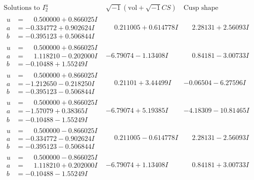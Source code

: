 \documentclass[1p]{elsarticle_modified}
\theoremstyle{definition}
\newcommand{\I}{\sqrt{-1}}
\begin{document}
$$\begin{array}{c|c|c}  
\text{Solutions to }I^u_{2}& \I (\text{vol} + \sqrt{-1}CS) & \text{Cusp shape}\\
 \hline 
\begin{aligned}
u &= \phantom{-}0.500000 + 0.866025 I \\
a &= -0.334772 + 0.902624 I \\
b &= -0.395123 + 0.506844 I\end{aligned}
 & \phantom{-}0.211005 + 0.614778 I & \phantom{-}2.28131 + 2.56093 I \\ \hline\begin{aligned}
u &= \phantom{-}0.500000 + 0.866025 I \\
a &= \phantom{-}1.118210 - 0.202000 I \\
b &= -0.10488 + 1.55249 I\end{aligned}
 & -6.79074 - 1.13408 I & \phantom{-}0.84181 - 3.00733 I \\ \hline\begin{aligned}
u &= \phantom{-}0.500000 + 0.866025 I \\
a &= -1.212650 - 0.218250 I \\
b &= -0.395123 - 0.506844 I\end{aligned}
 & \phantom{-}0.21101 + 3.44499 I & -0.06504 - 6.27596 I \\ \hline\begin{aligned}
u &= \phantom{-}0.500000 + 0.866025 I \\
a &= -1.57079 + 0.38365 I \\
b &= -0.10488 - 1.55249 I\end{aligned}
 & -6.79074 + 5.19385 I & -4.18309 - 10.81465 I \\ \hline\begin{aligned}
u &= \phantom{-}0.500000 - 0.866025 I \\
a &= -0.334772 - 0.902624 I \\
b &= -0.395123 - 0.506844 I\end{aligned}
 & \phantom{-}0.211005 - 0.614778 I & \phantom{-}2.28131 - 2.56093 I \\ \hline\begin{aligned}
u &= \phantom{-}0.500000 - 0.866025 I \\
a &= \phantom{-}1.118210 + 0.202000 I \\
b &= -0.10488 - 1.55249 I\end{aligned}
 & -6.79074 + 1.13408 I & \phantom{-}0.84181 + 3.00733 I \\ \hline\begin{aligned}

\end{aligned}
\end{array}$$
\end{document}
